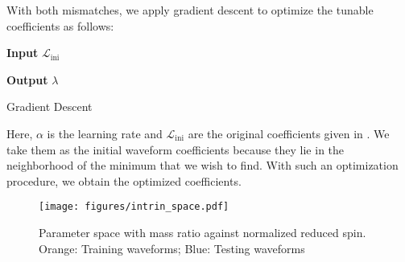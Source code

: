 \documentclass[twocolumn]{aastex631}
\begin{document}
With both mismatches, we apply gradient descent to optimize the tunable coefficients as follows: 
\begin{algorithm}[H]
	\hspace*{\algorithmicindent} \textbf{Input} $\mathcal{L}_{\mathrm{ini}}$
	\begin{algorithmic}[1]
		\EndWhile
	\end{algorithmic}
	\hspace*{\algorithmicindent} \textbf{Output} $\lambda$
	\caption{Gradient Descent}
\end{algorithm}
Here, $\alpha$ is the learning rate and $\mathcal{L}_{\mathrm{ini}}$ are the original coefficients given in \cite{khan2016frequency}. We take them as the initial waveform coefficients because they lie in the neighborhood of the minimum that we wish to find. With such an optimization procedure, we obtain the optimized coefficients. 

\begin{figure}[t]
	\centering
	\texttt{[image: figures/intrin\_space.pdf]}
	\caption{Parameter space with mass ratio against normalized reduced spin. Orange: Training waveforms; Blue: Testing waveforms}
	\label{fig:intrin_space}
\end{figure}
\end{document}
